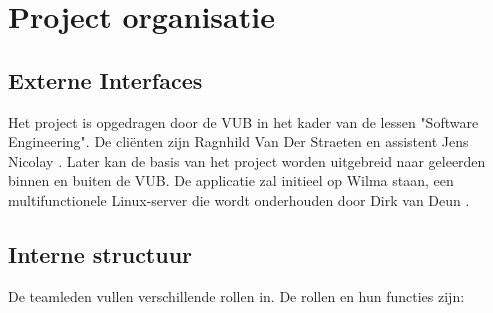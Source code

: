 \section{Project organisatie}

\subsection{Externe Interfaces}
Het project is opgedragen door de VUB in het kader van de lessen "Software Engineering". De cliënten zijn Ragnhild Van Der Straeten \cite{rvdstrae} en assistent Jens Nicolay \cite{jnicolay}. Later kan de basis van het project worden uitgebreid  naar geleerden binnen en buiten de VUB. De applicatie zal initieel op Wilma staan, een multifunctionele Linux-server die wordt onderhouden door Dirk van Deun \cite{dvdeun}. \\

\subsection{Interne structuur}
De teamleden vullen verschillende rollen in.
De rollen en hun functies zijn: 

